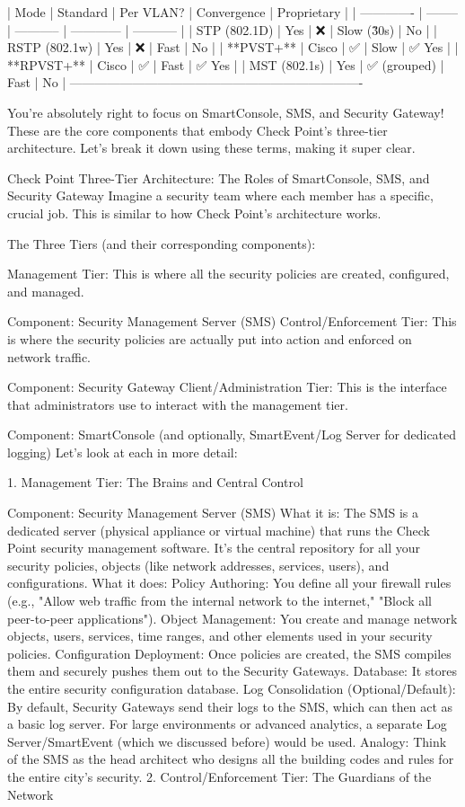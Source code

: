 | Mode          | Standard | Per VLAN?   | Convergence  | Proprietary |
| ------------- | -------- | ----------- | ------------ | ----------- |
| STP (802.1D)  | Yes      | ❌           | Slow (\~30s) | No         |
| RSTP (802.1w) | Yes      | ❌           | Fast         | No         |
| **PVST+**     | Cisco    | ✅           | Slow         | ✅ Yes     |
| **RPVST+**    | Cisco    | ✅           | Fast         | ✅ Yes     |
| MST (802.1s)  | Yes      | ✅ (grouped) | Fast         | No         |
----------------------------------------------------------------------


You're absolutely right to focus on SmartConsole, SMS, and Security Gateway! These are the core components that embody Check Point's three-tier architecture. Let's break it down using these terms, making it super clear.

Check Point Three-Tier Architecture: The Roles of SmartConsole, SMS, and Security Gateway
Imagine a security team where each member has a specific, crucial job. This is similar to how Check Point's architecture works.

The Three Tiers (and their corresponding components):

Management Tier: This is where all the security policies are created, configured, and managed.

Component: Security Management Server (SMS)
Control/Enforcement Tier: This is where the security policies are actually put into action and enforced on network traffic.

Component: Security Gateway
Client/Administration Tier: This is the interface that administrators use to interact with the management tier.

Component: SmartConsole (and optionally, SmartEvent/Log Server for dedicated logging)
Let's look at each in more detail:

1. Management Tier: The Brains and Central Control

Component: Security Management Server (SMS)
What it is: The SMS is a dedicated server (physical appliance or virtual machine) that runs the Check Point security management software. It's the central repository for all your security policies, objects (like network addresses, services, users), and configurations.
What it does:
Policy Authoring: You define all your firewall rules (e.g., "Allow web traffic from the internal network to the internet," "Block all peer-to-peer applications").
Object Management: You create and manage network objects, users, services, time ranges, and other elements used in your security policies.
Configuration Deployment: Once policies are created, the SMS compiles them and securely pushes them out to the Security Gateways.
Database: It stores the entire security configuration database.
Log Consolidation (Optional/Default): By default, Security Gateways send their logs to the SMS, which can then act as a basic log server. For large environments or advanced analytics, a separate Log Server/SmartEvent (which we discussed before) would be used.
Analogy: Think of the SMS as the head architect who designs all the building codes and rules for the entire city's security.
2. Control/Enforcement Tier: The Guardians of the Network

